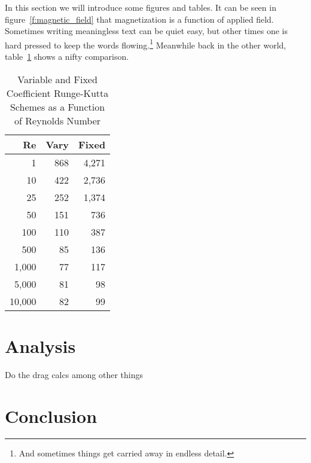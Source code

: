\documentclass[]{aiaa-tc}%
\begin{document}
In this section we will introduce some figures and tables.
It can be seen in figure~\ref{f:magnetic_field} that magnetization is a
function of applied field.
Sometimes writing meaningless text can be quiet easy, but other times
one is hard pressed to keep the words flowing.\footnote{And sometimes
things get carried away in endless detail.}
Meanwhile back in the other world, table~\ref{t:scheme_comparison} shows
a nifty comparison.\cite{Slutz2010}
\begin{table}%
 \begin{center}
  \caption{Variable and Fixed Coefficient Runge-Kutta Schemes as a
           Function of Reynolds Number}
  \label{t:scheme_comparison}
  \begin{tabular}{rrr}
       Re & Vary & Fixed \\\hline
        1 &  868 & 4,271 \\
       10 &  422 & 2,736 \\
       25 &  252 & 1,374 \\
       50 &  151 &   736 \\
      100 &  110 &   387 \\
      500 &   85 &   136 \\
    1,000 &   77 &   117 \\
    5,000 &   81 &    98 \\
   10,000 &   82 &    99
  \end{tabular}
 \end{center}
\end{table}

\section{Analysis}
Do the drag calcs among other things

\section{Conclusion}
\end{document}
